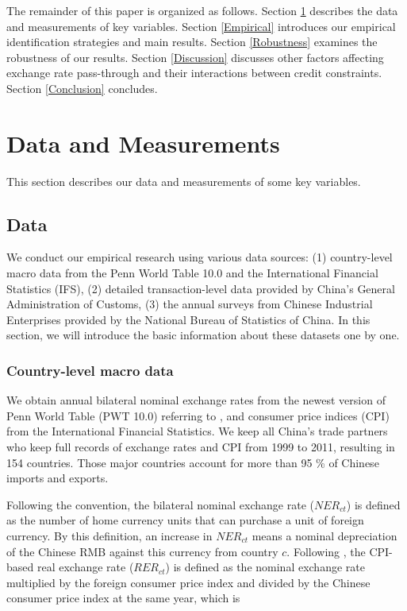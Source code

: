 \documentclass[12pt]{article}
\begin{document}
The remainder of this paper is organized as follows. Section \ref{Data&Measurements} describes the data and measurements of key variables. Section \ref{Empirical} introduces our empirical identification strategies and main results. Section \ref{Robustness} examines the robustness of our results.  Section \ref{Discussion} discusses other factors affecting exchange rate pass-through and their interactions between credit constraints. Section \ref{Conclusion} concludes.

\section{Data and Measurements} \label{Data&Measurements}

This section describes our data and measurements of some key variables.

\subsection{Data} \label{Data}

We conduct our empirical research using various data sources: (1) country-level macro data from the Penn World Table 10.0 and the International Financial Statistics (IFS), (2) detailed transaction-level data provided by China’s General Administration of Customs, (3) the annual surveys from Chinese Industrial Enterprises provided by the National Bureau of Statistics of China.  In this section, we will introduce the basic information about these datasets one by one.

\subsubsection{Country-level macro data} \label{Data-Macro}

We obtain annual bilateral nominal exchange rates from the newest version of Penn World Table (PWT 10.0) referring to \cite{feenstra2015}, and consumer price indices (CPI) from the International Financial Statistics. We keep all China's trade partners who keep full records of exchange rates and CPI from 1999 to 2011, resulting in 154 countries. Those major countries account for more than 95 \% of Chinese imports and exports.

Following the convention, the bilateral nominal exchange rate ($NER_{ct}$) is defined as the number of home currency units that can purchase a unit of foreign currency. By this definition, an increase in $NER_{ct}$ means a nominal depreciation of the Chinese RMB against this currency from country $c$. Following \cite{lmx2015}, the CPI-based real exchange rate ($RER_{ct}$) is defined as the nominal exchange rate multiplied by the foreign consumer price index and divided by the Chinese consumer price index at the same year, which is
\end{document}
